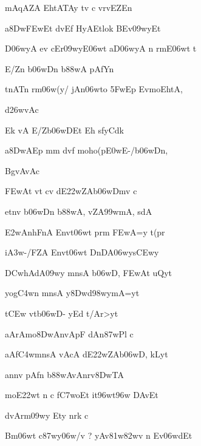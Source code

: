 {\dn mAqAZA\2 EhtATA\0y tv c vrvEZ\0En \vegdn\dontdisplaylinenum}

{\dn a\38Dw\3FEwEt d\?v\?Ef HyAEtlo{\qvb}k\? BEv\309wyEt{\dandabdn} \dontdisplaylinenum}

{\dn D\306wyA ev\2 cEr\309wyE\306wt aD\306wyA n rmE\306wt t \vegdn\dontdisplaylinenum}

{\dn E/Z\?n  b\306wD\?n b\388wA pAfY\?n  \dontdisplaylinenum}

{\dn t\?nAT\?{\qvb}n rm\306w(y/ jAn\306wto \35FwEp EvmoEhtA, \vegdn\dontdisplaylinenum}

{\dn d\?\326wvAc{\dandabdn}\dontdisplaylinenum }

{\dn Ek\2 vA E/Zb\306wD\?Et \5Eh s\2fyC\?dk{\dandadn} \dontdisplaylinenum}

{\dn a\38DwAEp mm d\?v\?f moho(p\3E0wE-/b\306wDn\4, \vegdn\dontdisplaylinenum}

{\dn BgvAvAc{\dandabdn}\dontdisplaylinenum }

{\dn \3FEwAt\2 v\4t\2 c\4v dE\322wZAb\306wDm\?v c{\dandadn} \dontdisplaylinenum}

{\dn et\?n\4v  b\306wD\?n b\388wA, vZA\0\399wmA, sdA \vegdn\dontdisplaylinenum}

{\dn \3E2wAnhFnA Envt\0\306wt\? prm\2 \3FEwA=y t(pr \dontdisplaylinenum}

{\dn i\3A3w-/FZA Envt\0\306wt\? DnDA\306wys\3CEwy\?{\dandadn}\dontdisplaylinenum }

{\dn \3DCw\?hAdA\309wy mnsA\2 b\306wD, \3FEwAt uQyt\? \vegdn\dontdisplaylinenum}

{\dn yog\3C4w\?n mnsA y\38Dwd\4\398wy\0mA=yt\?{\dandabdn} \dontdisplaylinenum}

{\dn t\3CEw v\4tb\306wD- yEd t/Ar>yt\? \vegdn\dontdisplaylinenum}

{\dn aArAmo\38DwAnvApF dAn\387wPl\? c{\dandabdn} \dontdisplaylinenum}

{\dn aAf\3C4wmnsA vAcA dE\322wZAb\306wD, kLyt\? \vegdn\dontdisplaylinenum}

{\dn an\?n\4v  pAf\?n b\388wAvAnrv\38DwTA{\dandabdn} \dontdisplaylinenum}

{\dn moE\322wt\2 n c f\3C7woEt it\396w\?t\396w DAvEt \vegdn\dontdisplaylinenum}

{\dn d\?vArm\309wy\? Ety\?{\qvb} nrk\? c{\dandabdn} \dontdisplaylinenum}

{\dn B\5m\306wt\? c\387wy\306w/\?v {\rs ?\re} yAv\381w\382wv\2 n Ev\306wdEt \vegdn\dontdisplaylinenum}

